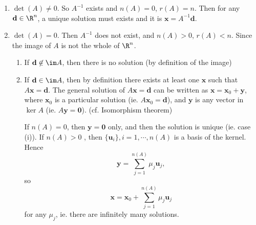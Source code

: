 \documentclass[a4paper]{article}
\begin{document}
\begin{enumerate}
  \item $\det(A) \not= 0$. So $A^{-1}$ exists and $n(A) = 0$, $r(A) = n$. Then for any $\mathbf{d}\in \R^n$, a unique solution must exists and it is $\mathbf{x} = A^{-1}\mathbf{d}$.
  \item $\det(A) = 0$. Then $A^{-1}$ does not exist, and $n(A) > 0$, $r(A) < n$. Since the image of $A$ is not the whole of $\R^n$.
    \begin{enumerate}
      \item If $\mathbf{d}\not\in \im A$, then there is no solution (by definition of the image)
      \item If $\mathbf{d}\in \im A$, then by definition there exists at least one $\mathbf{x}$ such that $A\mathbf{x} = \mathbf{d}$. The general solution of $A\mathbf{x} = \mathbf{d}$  can be written as $\mathbf{x} = \mathbf{x}_0 + \mathbf{y}$, where $\mathbf{x}_0$ is a particular solution (ie. $A\mathbf{x}_0 = \mathbf{d}$), and $\mathbf{y}$ is any vector in $\ker A$ (ie. $A\mathbf{y} = \mathbf{0}$). (cf. Isomorphism theorem)

        If $n(A) = 0$, then $\mathbf{y = 0}$ only, and then the solution is unique (ie. case (i)). If $n(A) > 0$ , then $\{\mathbf{u}_i\}, i = 1, \cdots, n(A)$ is a basis of the kernel. Hence
        \[
          \mathbf{y} = \sum_{j = 1}^{n(A)} \mu_j \mathbf{u}_j,
        \]
        so
        \[
          \mathbf{x} = \mathbf{x}_0 + \sum_{j = 1}^{n(A)} \mu_j \mathbf{u}_j
        \]
        for any $\mu_j$, ie. there are infinitely many solutions.
    \end{enumerate}
\end{enumerate}
\end{document}
